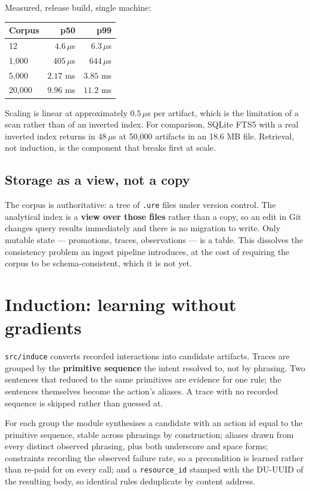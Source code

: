 \documentclass[11pt,twocolumn]{article}
\begin{document}
Measured, release build, single machine:

\begin{center}
\small
\begin{tabular}{@{}lrr@{}}
\toprule
\textbf{Corpus} & \textbf{p50} & \textbf{p99} \\
\midrule
12        & $4.6\,\mu$s   & $6.3\,\mu$s \\
1{,}000   & $405\,\mu$s  & $644\,\mu$s \\
5{,}000   & $2.17$ ms    & $3.85$ ms \\
20{,}000  & $9.96$ ms    & $11.2$ ms \\
\bottomrule
\end{tabular}
\normalsize
\end{center}

Scaling is linear at approximately $0.5\,\mu$s per artifact, which is the
limitation of a scan rather than of an inverted index. For comparison, SQLite
FTS5 with a real inverted index returns in $48\,\mu$s at 50{,}000 artifacts in an
18.6 MB file. Retrieval, not induction, is the component that breaks first at
scale.

\subsection{Storage as a view, not a copy}

The corpus is authoritative: a tree of \texttt{.ure} files under version
control. The analytical index is a \textbf{view over those files} rather than a
copy, so an edit in Git changes query results immediately and there is no
migration to write. Only mutable state --- promotions, traces, observations ---
is a table. This dissolves the consistency problem an ingest pipeline
introduces, at the cost of requiring the corpus to be schema-consistent, which
it is not yet.

\section{Induction: learning without gradients}

\texttt{src/induce} converts recorded interactions into candidate artifacts.
Traces are grouped by the \textbf{primitive sequence} the intent resolved to, not
by phrasing. Two sentences that reduced to the same primitives are evidence for
one rule; the sentences themselves become the action's aliases. A trace with no
recorded sequence is skipped rather than guessed at.

For each group the module synthesises a candidate with an action id equal to the
primitive sequence, stable across phrasings by construction; aliases drawn from
every distinct observed phrasing, plus both underscore and space forms;
constraints recording the observed failure rate, so a precondition is learned
rather than re-paid for on every call; and a \texttt{resource\_id} stamped with
the DU-UUID of the resulting body, so identical rules deduplicate by content
address.
\end{document}
